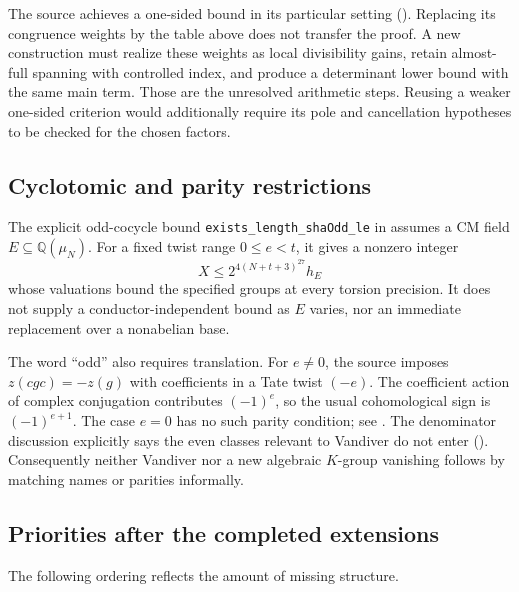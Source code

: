 The source achieves a one-sided bound in its particular setting
().
Replacing its congruence weights by the table above does not transfer
the proof. A new construction must realize these weights as local
divisibility gains, retain almost-full spanning with controlled index,
and produce a determinant lower bound with the same main term.
Those are the unresolved arithmetic steps. Reusing a weaker one-sided
criterion would additionally require its pole and cancellation
hypotheses to be checked for the chosen factors.

\subsection{Cyclotomic and parity restrictions}

The explicit odd-cocycle bound
\texttt{exists\_length\_shaOdd\_le} in
assumes a CM field $E\subseteq\mathbb Q(\mu_N)$. For a fixed twist range
$0\le e<t$, it gives a nonzero integer
\[
 X\le 2^{4(N+t+3)^{27}}h_E
\]
whose valuations bound the specified groups at every torsion precision.
It does not supply a conductor-independent bound as $E$ varies, nor an
immediate replacement over a nonabelian base.

The word ``odd'' also requires translation. For $e\ne0$, the source
imposes $z(cgc)=-z(g)$ with coefficients in a Tate twist $(-e)$.
The coefficient action of complex conjugation contributes $(-1)^e$,
so the usual cohomological sign is $(-1)^{e+1}$.
The case $e=0$ has no such parity condition; see
.
The denominator discussion explicitly says the even classes relevant
to Vandiver do not enter
().
Consequently neither Vandiver nor a new algebraic $K$-group vanishing
follows by matching names or parities informally.

\subsection{Priorities after the completed extensions}

The following ordering reflects the amount of missing structure.

